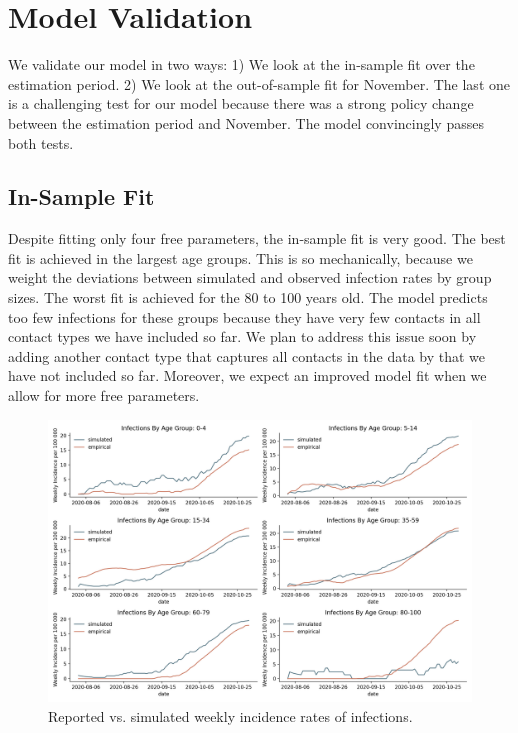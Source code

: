 \section{Model Validation}
\label{sec:model_validation}

We validate our model in two ways: 1) We look at the in-sample fit over the estimation
period. 2) We look at the out-of-sample fit for November. The last one is a challenging
test for our model because there was a strong policy change between the estimation
period and November. The model convincingly passes both tests.


\subsection{In-Sample Fit}
\label{sub:in_sample_fit}

Despite fitting only four free parameters, the in-sample fit is very good. The best fit
is achieved in the largest age groups. This is so mechanically, because we weight the
deviations between simulated and observed infection rates by group sizes. The worst fit
is achieved for the 80 to 100 years old. The model predicts too few infections for these
groups because they have very few contacts in all contact types we have included so far.
We plan to address this issue soon by adding another contact type that captures all
contacts in the data by \citet{Mossong2008} that we have not included so far. Moreover,
we expect an improved model fit when we allow for more free parameters.

\begin{figure}[!tp]
    \centering
    \includegraphics[width=\textwidth]{../figures/goodness_of_fit_by_age_group}
    \caption{Reported vs. simulated weekly incidence rates of infections.}
    \label{fig:goodness_of_fit}
\end{figure}


